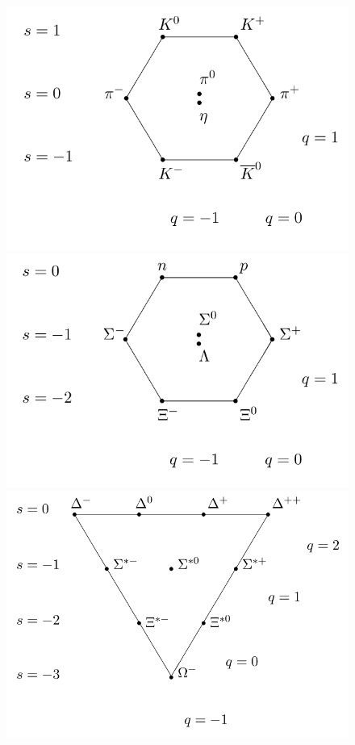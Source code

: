 \begingroup\setlength{\intextsep}{5pt}\setlength{\columnsep}{15pt}
	
	\begin{figure}
		\vspace{-10pt}
		\begin{minipage}{\linewidth}
			\centering\captionsetup[subfigure]{justification=centering}
			\includegraphics[width=\linewidth]{fig/chapt2/Meson_octet.png}
			\subcaption{\label{fig:Eightfold:A}}
			\includegraphics[width=\linewidth]{fig/chapt2/Baryon_octet.png}
			\subcaption{\label{fig:Eightfold:B}}
			\includegraphics[width=\linewidth]{fig/chapt2/Baryon_decuplet.png}

\end{minipage}
\end{figure}
